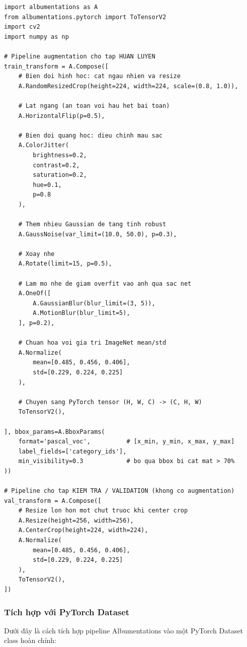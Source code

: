 \begin{verbatim}
import albumentations as A
from albumentations.pytorch import ToTensorV2
import cv2
import numpy as np

# Pipeline augmentation cho tap HUAN LUYEN
train_transform = A.Compose([
    # Bien doi hinh hoc: cat ngau nhien va resize
    A.RandomResizedCrop(height=224, width=224, scale=(0.8, 1.0)),

    # Lat ngang (an toan voi hau het bai toan)
    A.HorizontalFlip(p=0.5),

    # Bien doi quang hoc: dieu chinh mau sac
    A.ColorJitter(
        brightness=0.2,
        contrast=0.2,
        saturation=0.2,
        hue=0.1,
        p=0.8
    ),

    # Them nhieu Gaussian de tang tinh robust
    A.GaussNoise(var_limit=(10.0, 50.0), p=0.3),

    # Xoay nhe
    A.Rotate(limit=15, p=0.5),

    # Lam mo nhe de giam overfit vao anh qua sac net
    A.OneOf([
        A.GaussianBlur(blur_limit=(3, 5)),
        A.MotionBlur(blur_limit=5),
    ], p=0.2),

    # Chuan hoa voi gia tri ImageNet mean/std
    A.Normalize(
        mean=[0.485, 0.456, 0.406],
        std=[0.229, 0.224, 0.225]
    ),

    # Chuyen sang PyTorch tensor (H, W, C) -> (C, H, W)
    ToTensorV2(),

], bbox_params=A.BboxParams(
    format='pascal_voc',          # [x_min, y_min, x_max, y_max]
    label_fields=['category_ids'],
    min_visibility=0.3            # bo qua bbox bi cat mat > 70%
))

# Pipeline cho tap KIEM TRA / VALIDATION (khong co augmentation)
val_transform = A.Compose([
    # Resize lon hon mot chut truoc khi center crop
    A.Resize(height=256, width=256),
    A.CenterCrop(height=224, width=224),
    A.Normalize(
        mean=[0.485, 0.456, 0.406],
        std=[0.229, 0.224, 0.225]
    ),
    ToTensorV2(),
])
\end{verbatim}

\subsubsection{Tích hợp với PyTorch Dataset}

Dưới đây là cách tích hợp pipeline Albumentations vào một PyTorch Dataset class hoàn chỉnh:

